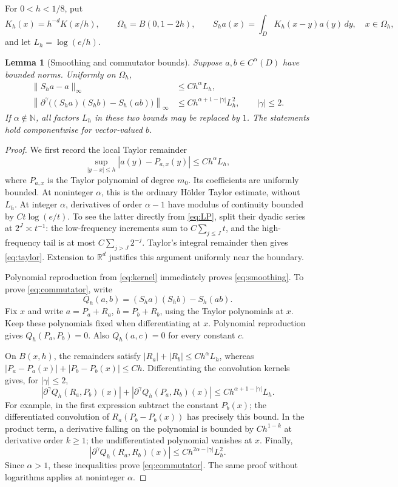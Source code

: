 \documentclass[11pt]{article}
\newtheorem{lemma}[theorem]{Lemma}
\theoremstyle{remark}
\newcommand{\R}{\mathbb R}
\begin{document}
For \(0<h<1/8\), put
\[
K_h(x)=h^{-d}K(x/h),\qquad
\Omega_h=B(0,1-2h),\qquad
S_h a(x)=\int_D K_h(x-y)a(y)\,dy,\quad x\in\Omega_h,
\]
and let \(L_h=\log(e/h)\).

\begin{lemma}[Smoothing and commutator bounds]\label{lem:commutator}
Suppose \(a,b\in C^\alpha(D)\) have bounded norms. Uniformly on
\(\Omega_h\),
\begin{align}
\|S_h a-a\|_\infty&\leq C h^\alpha L_h,
\label{eq:smoothing}\\
\left\|\partial^\gamma
\big((S_h a)(S_h b)-S_h(ab)\big)\right\|_\infty
&\leq C h^{\alpha+1-|\gamma|}L_h^2,
\qquad |\gamma|\leq2.
\label{eq:commutator}
\end{align}
If \(\alpha\notin\mathbb N\), all factors \(L_h\) in these two
bounds may be replaced by \(1\). The statements hold componentwise
for vector-valued \(b\).
\end{lemma}

\begin{proof}
We first record the local Taylor remainder
\begin{equation}\label{eq:taylor}
\sup_{|y-x|\leq h}|a(y)-P_{a,x}(y)|
\leq C h^\alpha L_h,
\end{equation}
where \(P_{a,x}\) is the Taylor polynomial of degree \(m_0\).
Its coefficients are uniformly bounded. At noninteger \(\alpha\),
this is the ordinary H\"older Taylor estimate, without \(L_h\).
At integer \(\alpha\), derivatives of order \(\alpha-1\) have
modulus of continuity bounded by \(Ct\log(e/t)\). To see the latter
directly from \eqref{eq:LP}, split their dyadic series at
\(2^J\asymp t^{-1}\): the low-frequency increments sum to
\(C\sum_{j\leq J}t\), and the high-frequency tail is at most
\(C\sum_{j>J}2^{-j}\). Taylor's integral remainder then gives
\eqref{eq:taylor}. Extension to \(\R^d\) justifies this argument
uniformly near the boundary.

Polynomial reproduction from \eqref{eq:kernel} immediately proves
\eqref{eq:smoothing}. To prove \eqref{eq:commutator}, write
\[
Q_h(a,b)=(S_h a)(S_h b)-S_h(ab).
\]
Fix \(x\) and write \(a=P_a+R_a\), \(b=P_b+R_b\), using the Taylor
polynomials at \(x\). Keep these polynomials fixed when differentiating
at \(x\). Polynomial reproduction gives \(Q_h(P_a,P_b)=0\).
Also \(Q_h(a,c)=0\) for every constant \(c\).

On \(B(x,h)\), the remainders satisfy
\(|R_a|+|R_b|\leq Ch^\alpha L_h\), whereas
\(|P_a-P_a(x)|+|P_b-P_b(x)|\leq Ch\).
Differentiating the convolution kernels gives, for \(|\gamma|\leq2\),
\[
|\partial^\gamma Q_h(R_a,P_b)(x)|
+
|\partial^\gamma Q_h(P_a,R_b)(x)|
\leq C h^{\alpha+1-|\gamma|}L_h.
\]
For example, in the first expression subtract the constant \(P_b(x)\);
the differentiated convolution of
\(R_a(P_b-P_b(x))\) has precisely this bound. In the product term,
a derivative falling on the polynomial is bounded by
\(Ch^{1-k}\) at derivative order \(k\geq1\); the undifferentiated
polynomial vanishes at \(x\). Finally,
\[
|\partial^\gamma Q_h(R_a,R_b)(x)|
\leq C h^{2\alpha-|\gamma|}L_h^2.
\]
Since \(\alpha>1\), these inequalities prove
\eqref{eq:commutator}. The same proof without logarithms applies
at noninteger \(\alpha\).
\end{proof}
\end{document}
